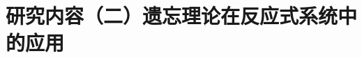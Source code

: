 \documentclass[aspectratio=1610, 9pt, CJK]{beamer}
\begin{document}

\section{研究内容（二）遗忘理论在反应式系统中的应用}
\end{document}
